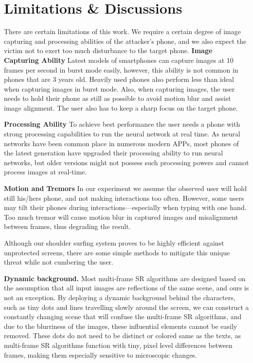 \section{Limitations \& Discussions}
\label{sec-limitations-and-discussions}
There are certain limitations of this work. We require a certain degree of image capturing and processing abilities of the attacker's phone, and we also expect the victim not to exert too much disturbance to the target phone.
\vspace{1mm}
\noindent
\textbf{Image Capturing Ability}
Latest models of smartphones can capture images at 10 frames per second in burst mode easily, however, this ability is not common in phones that are 3 years old. Heavily used phones also perform less than ideal when capturing images in burst mode. Also, when capturing images, the user needs to hold their phone as still as possible to avoid motion blur and assist image alignment. The user also has to keep a sharp focus on the target phone.

\vspace{1mm}
\noindent
\textbf{Processing Ability}
To achieve best performance the user needs a phone with strong processing capabilities to run the neural network at real time. As neural networks have been common place in numerous modern APPs, most phones of the latest generation have upgraded their processing ability to run neural networks, but older versions might not possess such processing powers and cannot process images at real-time.

\vspace{1mm}
\noindent
\textbf{Motion and Tremors}
In our experiment we assume the observed user will hold still his/hers phone, and not making interactions too often. However, some users may tilt their phones during interactions---especially when typing with one hand. Too much tremor will cause motion blur in captured images and misalignment between frames, thus degrading the result.

Although our shoulder surfing system proves to be highly efficient against unprotected screens, there are some simple methods to mitigate this unique threat while not cumbering the user.

\vspace{1mm}
\noindent
\textbf{Dynamic background.} Most multi-frame SR algorithms are designed based on the assumption that all input images are reflections of the same scene, and ours is not an exception. By deploying a dynamic background behind the characters, such as tiny dots and lines travelling slowly around the screen, we can construct a constantly changing scene that will confuse the multi-frame SR algorithms, and due to the blurriness of the images, these influential elements cannot be easily removed. These dots do not need to be distinct or colored same as the texts, as multi-frame SR algorithms function with tiny, pixel level differences between frames, making them especially sensitive to microscopic changes.


